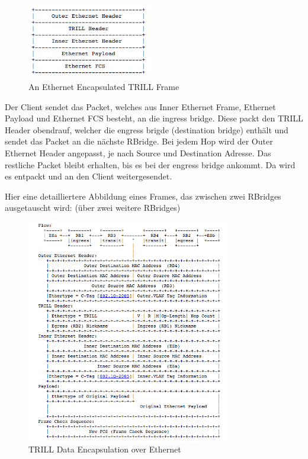 \documentclass[a4,12pt]{scrartcl}
\begin{document}
\begin{figure} [H]
	\begin{center}
	\includegraphics[width=0.50\textwidth]{./pictures/trill_encapsulation.png}
	\caption{An Ethernet Encapsulated TRILL Frame}
	\label{x}
	\end{center}
\end{figure}

\noindent Der Client sendet das Packet, welches aus Inner Ethernet Frame, Ethernet Payload und Ethernet FCS besteht, an die ingress bridge. Diese packt den TRILL Header obendrauf, welcher die engress brigde (destination bridge) enthält und sendet das Packet an die nächste RBridge. Bei jedem Hop wird der Outer Ethernet Header angepasst, je nach Source und Destination Adresse. Das restliche Packet bleibt erhalten, bis es bei der engress bridge ankommt. Da wird es entpackt und an den Client weitergesendet. 
\newpage

\noindent Hier eine detailliertere Abbildung eines Frames, das zwischen zwei RBridges ausgetauscht wird: (über zwei weitere RBridges) 
\begin{figure} [H]
	\begin{center}
	\includegraphics[width=0.80\textwidth]{./pictures/trill_frame_flow.png}
	\caption{TRILL Data Encapsulation over Ethernet}
	\label{x}
	\end{center}
\end{figure}
\end{document}
